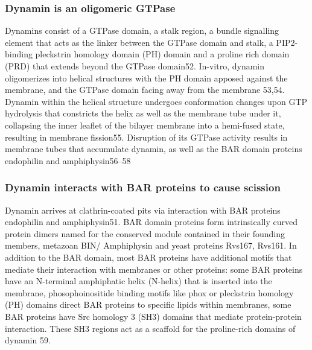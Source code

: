 		 
		\subsubsection{Dynamin is an oligomeric GTPase}
		Dynamins consist of a GTPase domain, a stalk region, a bundle signalling element that acts as the linker between the GTPase domain and stalk, a PIP2-binding pleckstrin homology domain (PH) domain and a proline rich domain (PRD) that extends beyond the GTPase domain52. In-vitro, dynamin oligomerizes into helical structures with the PH domain apposed against the membrane, and the GTPase domain facing away from the membrane 53,54. Dynamin within the helical structure undergoes conformation changes upon GTP hydrolysis that constricts the helix as well as the membrane tube under it, collapsing the inner leaflet of the bilayer membrane into a hemi-fused state, resulting in membrane fission55. Disruption of its GTPase activity results in membrane tubes that accumulate dynamin, as well as the BAR domain proteins endophilin and amphiphysin56–58
		



		\subsubsection{Dynamin interacts with BAR proteins to cause scission}
		Dynamin arrives at clathrin-coated pits via interaction with BAR proteins endophilin and amphiphysin51. BAR domain proteins form intrinsically curved protein dimers named for the conserved module contained in their founding members, metazoan BIN/ Amphiphysin and yeast proteins Rvs167, Rvs161. In addition to the BAR domain, most BAR proteins have additional motifs that mediate their interaction with membranes or other proteins: some BAR proteins have an N-terminal amphiphatic helix (N-helix) that is inserted into the membrane, phosophoinositide binding motifs like phox or pleckstrin homology (PH) domains direct BAR proteins to specific lipids within membranes, some BAR proteins have Src homology 3 (SH3) domains that mediate protein-protein interaction. These SH3 regions act as a scaffold for the proline-rich domains of dynamin 59. 


